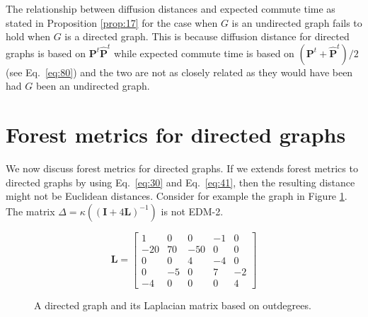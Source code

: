 The relationship between diffusion distances and expected commute time
as stated in Proposition \ref{prop:17} for the case when $G$ is an
undirected graph fails to hold when $G$ is a directed graph. This is
because diffusion distance for directed graphs is based on
$\mathbf{P}^{t}\hat{\mathbf{P}}^{t}$ while expected commute time is
based on $(\mathbf{P}^{t} + \hat{\mathbf{P}}^{t})/2$ (see
Eq.~\eqref{eq:80}) and the two are not as closely related as they
would have been had $G$ been an undirected graph. 
\section{Forest metrics for directed graphs}
\label{sec:forest-metr-direct}
We now discuss forest metrics
\citep{chebotarev02:_fores_metric_for_graph_vertic} for directed
graphs. If we extends forest metrics to directed graphs by using
Eq.~\eqref{eq:30} and Eq.~\eqref{eq:41}, then the resulting distance
might not be Euclidean distances. Consider for example the graph in
Figure \ref{fig:directed_graph1}. The matrix $\Delta =
\kappa((\mathbf{I} + 4 \mathbf{L})^{-1})$ is not EDM-2.
\begin{figure}[hbtp]
  \centering
  \begin{minipage}[c]{0.45\textwidth}
    \centering
  \end{minipage}
  \begin{minipage}[c]{0.38\textwidth}
    \begin{equation*}
      \mathbf{L} = \left[ \begin{array}{rrrrr}
          1  & 0  & 0  & -1  & 0 \\
          -20 & 70  & -50  & 0 & 0 \\
          0  & 0 & 4  & -4 & 0 \\
          0 & -5 & 0  & 7 & -2 \\
          -4 & 0 & 0 & 0 & 4
       \end{array} \right ]
    \end{equation*}
    \caption{A directed graph and its Laplacian matrix based on outdegrees.}
    \label{fig:directed_graph1}
  \end{minipage}
\end{figure}
